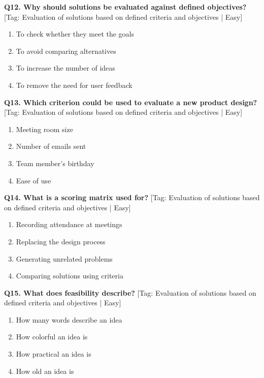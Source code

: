\noindent\textbf{Q12. Why should solutions be evaluated against defined objectives?} \hfill [Tag: Evaluation of solutions based on defined criteria and objectives | Easy]
\begin{enumerate}[label=(\alph*),topsep=2pt,itemsep=1pt,partopsep=0pt,parsep=0pt]
    \item {To check whether they meet the goals}
    \item {To avoid comparing alternatives}
    \item {To increase the number of ideas}
    \item {To remove the need for user feedback}
\end{enumerate}
\vspace{2mm}

\noindent\textbf{Q13. Which criterion could be used to evaluate a new product design?} \hfill [Tag: Evaluation of solutions based on defined criteria and objectives | Easy]
\begin{enumerate}[label=(\alph*),topsep=2pt,itemsep=1pt,partopsep=0pt,parsep=0pt]
    \item {Meeting room size}
    \item {Number of emails sent}
    \item {Team member's birthday}
    \item {Ease of use}
\end{enumerate}
\vspace{2mm}

\noindent\textbf{Q14. What is a scoring matrix used for?} \hfill [Tag: Evaluation of solutions based on defined criteria and objectives | Easy]
\begin{enumerate}[label=(\alph*),topsep=2pt,itemsep=1pt,partopsep=0pt,parsep=0pt]
    \item {Recording attendance at meetings}
    \item {Replacing the design process}
    \item {Generating unrelated problems}
    \item {Comparing solutions using criteria}
\end{enumerate}
\vspace{2mm}

\noindent\textbf{Q15. What does feasibility describe?} \hfill [Tag: Evaluation of solutions based on defined criteria and objectives | Easy]
\begin{enumerate}[label=(\alph*),topsep=2pt,itemsep=1pt,partopsep=0pt,parsep=0pt]
    \item {How many words describe an idea}
    \item {How colorful an idea is}
    \item {How practical an idea is}
    \item {How old an idea is}
\end{enumerate}
\vspace{2mm}

